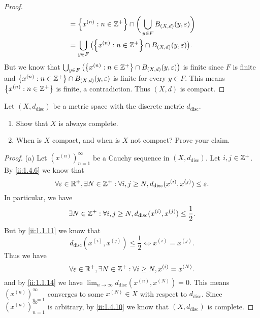 \begin{proof}
\begin{align*}
                               & = \set{x^{(n)} : n \in \Z^+} \cap \bigg(\bigcup_{y \in F} B_{(X, d)}(y, \varepsilon)\bigg) \\
                               & = \bigcup_{y \in F} \big(\set{x^{(n)} : n \in \Z^+} \cap B_{(X, d)}(y, \varepsilon)\big).
  \end{align*}
  But we know that \(\bigcup_{y \in F} \big(\set{x^{(n)} : n \in \Z^+} \cap B_{(X, d)}(y, \varepsilon)\big)\) is finite since \(F\) is finite and \(\left\lbrace x^{(n)} : n \in \mathbb{Z}^+\right\rbrace \cap B_{(X, d)}(y, \varepsilon)\) is finite for every \(y \in F\).
  This means \(\left\lbrace x^{(n)} : n \in \mathbb{Z}^+\right\rbrace\) is finite, a contradiction.
  Thus \((X, d)\) is compact.
\end{proof}

\begin{ex}\label{ii:ex:1.5.12}
  Let \((X, d_{\text{disc}})\) be a metric space with the discrete metric \(d_{\text{disc}}\).
  \begin{enumerate}
    \item Show that \(X\) is always complete.
    \item When is \(X\) compact, and when is \(X\) not compact?
          Prove your claim.
  \end{enumerate}
\end{ex}

\begin{proof}{(a)}
  Let \((x^{(n)})_{n = 1}^\infty\) be a Cauchy sequence in \((X, d_{\text{disc}})\).
  Let \(i, j \in \mathbb{Z}^+\).
  By \cref{ii:1.4.6} we know that
  \[
    \forall \varepsilon \in \mathbb{R}^+, \exists N \in \mathbb{Z}^+ : \forall i, j \geq N, d_{\text{disc}}(x^{(i)}, x^{(j)}) \leq \varepsilon.
  \]
  In particular, we have
  \[
    \exists N \in \mathbb{Z}^+ : \forall i, j \geq N, d_{\text{disc}}(x^{(i)}, x^{(j)}) \leq \dfrac{1}{2}.
  \]
  But by \cref{ii:1.1.11} we know that
  \[
    d_{\text{disc}}(x^{(i)}, x^{(j)}) \leq \dfrac{1}{2} \iff x^{(i)} = x^{(j)}.
  \]
  Thus we have
  \[
    \forall \varepsilon \in \mathbb{R}^+, \exists N \in \mathbb{Z}^+ : \forall i \geq N, x^{(i)} = x^{(N)}.
  \]
  and by \cref{ii:1.1.14} we have \(\lim_{n \to \infty} d_{\text{disc}}(x^{(n)}, x^{(N)}) = 0\).
  This means \((x^{(n)})_{n = 1}^\infty\) converges to some \(x^{(N)} \in X\) with respect to \(d_{\text{disc}}\).
  Since \((x^{(n)})_{n = 1}^\infty\) is arbitrary, by \cref{ii:1.4.10} we know that \((X, d_{\text{disc}})\) is complete.
\end{proof}

